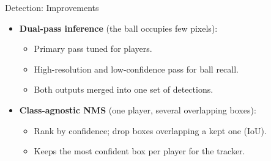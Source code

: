 \begin{frame}{Detection: Improvements}
\begin{itemize}
  \item \textbf{Dual-pass inference} (the ball occupies few pixels):
  \begin{itemize}
    \item Primary pass tuned for players.
    \item High-resolution and low-confidence pass for ball recall.
    \item Both outputs merged into one set of detections.
  \end{itemize}
  \item \textbf{Class-agnostic NMS} \cite{nms} (one player, several overlapping boxes):
  \begin{itemize}
    \item Rank by confidence; drop boxes overlapping a kept one (IoU).
    \item Keeps the most confident box per player for the tracker.
  \end{itemize}
\end{itemize}
\end{frame}
